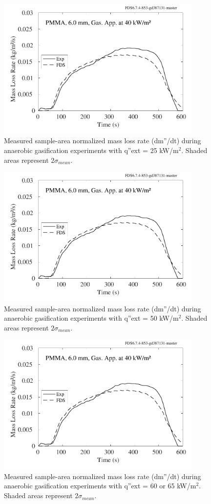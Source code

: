 \documentclass{book}
\begin{document}
\begin{figure}
  \centering
  \includegraphics[width=4in]{SCRIPT_FIGURES/PMMA_40}
  \caption{Measured sample-area normalized mass loss rate (dm”/dt) during anaerobic gasification experiments with q”ext = 25 kW/m$^2$. Shaded areas represent $2\sigma_{mean}$.}
  \label{Fig_23}
\end{figure}

\begin{figure}
  \centering
  \includegraphics[width=4in]{SCRIPT_FIGURES/PMMA_40}
  \caption{Measured sample-area normalized mass loss rate (dm”/dt) during anaerobic gasification experiments with q”ext = 50 kW/m$^2$. Shaded areas represent $2\sigma_{mean}$.}
  \label{Fig_24}
\end{figure}

\begin{figure}
  \centering
  \includegraphics[width=4in]{SCRIPT_FIGURES/PMMA_40}
  \caption{Measured sample-area normalized mass loss rate (dm”/dt) during anaerobic gasification experiments with q”ext = 60 or 65 kW/m$^2$. Shaded areas represent $2\sigma_{mean}$.}
  \label{Fig_25}
\end{figure}
\end{document}

